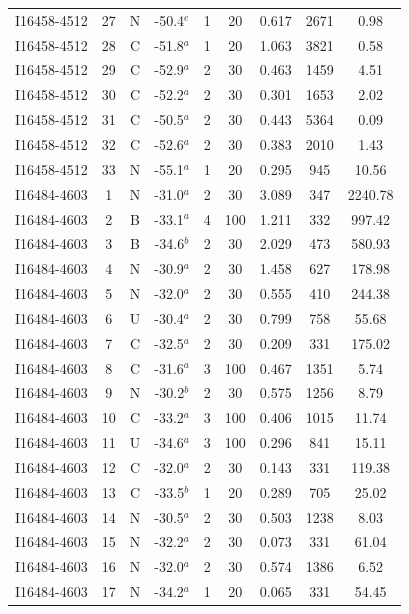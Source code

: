 \begin{table}
\begin{tabular}{ccccccccc}
I16458-4512 & 27 & N & -50.4$^{e}$ & 1 & 20 & 0.617 & 2671 & 0.98 \\
I16458-4512 & 28 & C & -51.8$^{a}$ & 1 & 20 & 1.063 & 3821 & 0.58 \\
I16458-4512 & 29 & C & -52.9$^{a}$ & 2 & 30 & 0.463 & 1459 & 4.51 \\
I16458-4512 & 30 & C & -52.2$^{a}$ & 2 & 30 & 0.301 & 1653 & 2.02 \\
I16458-4512 & 31 & C & -50.5$^{a}$ & 2 & 30 & 0.443 & 5364 & 0.09 \\
I16458-4512 & 32 & C & -52.6$^{a}$ & 2 & 30 & 0.383 & 2010 & 1.43 \\
I16458-4512 & 33 & N & -55.1$^{a}$ & 1 & 20 & 0.295 & 945 & 10.56 \\
I16484-4603 & 1 & N & -31.0$^{a}$ & 2 & 30 & 3.089 & 347 & 2240.78 \\
I16484-4603 & 2 & B & -33.1$^{a}$ & 4 & 100 & 1.211 & 332 & 997.42 \\
I16484-4603 & 3 & B & -34.6$^{b}$ & 2 & 30 & 2.029 & 473 & 580.93 \\
I16484-4603 & 4 & N & -30.9$^{a}$ & 2 & 30 & 1.458 & 627 & 178.98 \\
I16484-4603 & 5 & N & -32.0$^{a}$ & 2 & 30 & 0.555 & 410 & 244.38 \\
I16484-4603 & 6 & U & -30.4$^{a}$ & 2 & 30 & 0.799 & 758 & 55.68 \\
I16484-4603 & 7 & C & -32.5$^{a}$ & 2 & 30 & 0.209 & 331 & 175.02 \\
I16484-4603 & 8 & C & -31.6$^{a}$ & 3 & 100 & 0.467 & 1351 & 5.74 \\
I16484-4603 & 9 & N & -30.2$^{b}$ & 2 & 30 & 0.575 & 1256 & 8.79 \\
I16484-4603 & 10 & C & -33.2$^{a}$ & 3 & 100 & 0.406 & 1015 & 11.74 \\
I16484-4603 & 11 & U & -34.6$^{a}$ & 3 & 100 & 0.296 & 841 & 15.11 \\
I16484-4603 & 12 & C & -32.0$^{a}$ & 2 & 30 & 0.143 & 331 & 119.38 \\
I16484-4603 & 13 & C & -33.5$^{b}$ & 1 & 20 & 0.289 & 705 & 25.02 \\
I16484-4603 & 14 & N & -30.5$^{a}$ & 2 & 30 & 0.503 & 1238 & 8.03 \\
I16484-4603 & 15 & N & -32.2$^{a}$ & 2 & 30 & 0.073 & 331 & 61.04 \\
I16484-4603 & 16 & N & -32.0$^{a}$ & 2 & 30 & 0.574 & 1386 & 6.52 \\
I16484-4603 & 17 & N & -34.2$^{a}$ & 1 & 20 & 0.065 & 331 & 54.45 \\

\end{tabular}
\end{table}
